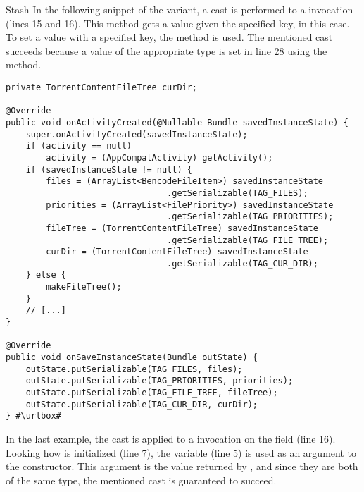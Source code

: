 \begin{pattern}{Stash}
In the following snippet of the  variant,
a cast is performed to a  invocation (lines 15 and 16).
This method gets a  value given the specified key,  in this case.
To set a value with a specified key, the  method is used.
The mentioned cast succeeds because a value of the appropriate type is set in line 28 using the  method.

\def\urlvar{http://bit.ly/proninyaroslav_libretorrent_2TxpZCM}
\begin{verbatim}
private TorrentContentFileTree curDir;

@Override
public void onActivityCreated(@Nullable Bundle savedInstanceState) {
    super.onActivityCreated(savedInstanceState);
    if (activity == null)
        activity = (AppCompatActivity) getActivity();
    if (savedInstanceState != null) {
        files = (ArrayList<BencodeFileItem>) savedInstanceState
                                .getSerializable(TAG_FILES);
        priorities = (ArrayList<FilePriority>) savedInstanceState
                                .getSerializable(TAG_PRIORITIES);
        fileTree = (TorrentContentFileTree) savedInstanceState
                                .getSerializable(TAG_FILE_TREE);
        curDir = (TorrentContentFileTree) savedInstanceState
                                .getSerializable(TAG_CUR_DIR);
    } else {
        makeFileTree();
    }
    // [...]
}

@Override
public void onSaveInstanceState(Bundle outState) {
    outState.putSerializable(TAG_FILES, files);
    outState.putSerializable(TAG_PRIORITIES, priorities);
    outState.putSerializable(TAG_FILE_TREE, fileTree);
    outState.putSerializable(TAG_CUR_DIR, curDir);
} #\urlbox#
\end{verbatim}

In the last example,
the cast is applied to a  invocation on the  field (line 16).
Looking how  is initialized (line 7),
the  variable (line 5) is used as an argument to the constructor.
This argument is the value returned by ,
and since they are both of the same type,
the mentioned cast is guaranteed to succeed.


\end{pattern}
